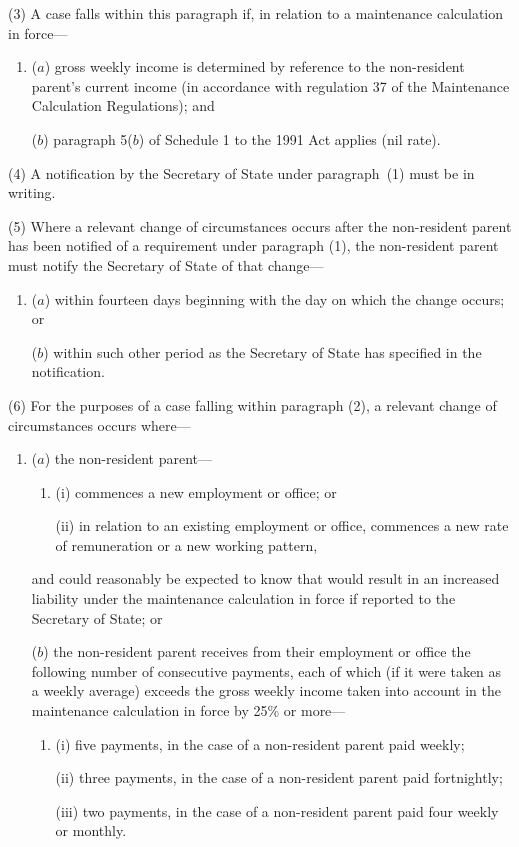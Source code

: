 \documentclass[12pt,a4paper]{article}
\begin{document}
(3) A case falls within this paragraph if, in relation to a maintenance calculation in force—
\begin{enumerate}\item[]
($a$) gross weekly income is determined by reference to the non-resident parent’s current income (in accordance with regulation 37 of the Maintenance Calculation Regulations); and

($b$) paragraph 5($b$)  of Schedule 1 to the 1991 Act applies (nil rate).
\end{enumerate}

(4) A notification by the Secretary of State under paragraph~(1) must be in writing.

(5) Where a relevant change of circumstances occurs after the non-resident parent has been notified of a requirement under paragraph (1), the non-resident parent must notify the Secretary of State of that change—
\begin{enumerate}\item[]
($a$) within fourteen days beginning with the day on which the change occurs; or

($b$) within such other period as the Secretary of State has specified in the notification.
\end{enumerate}

(6) For the purposes of a case falling within paragraph (2), a relevant change of circumstances occurs where—
\begin{enumerate}\item[]
($a$) the non-resident parent—
\begin{enumerate}\item[]
(i) commences a new employment or office; or

(ii) in relation to an existing employment or office, commences a new rate of remuneration or a new working pattern,
\end{enumerate}
and could reasonably be expected to know that would result in an increased liability under the maintenance calculation in force if reported to the Secretary of State; or

($b$) the non-resident parent receives from their employment or office the following number of consecutive payments, each of which (if it were taken as a weekly average) exceeds the gross weekly income taken into account in the maintenance calculation in force by 25\% or more—
\begin{enumerate}\item[]
(i) five payments, in the case of a non-resident parent paid weekly;

(ii) three payments, in the case of a non-resident parent paid fortnightly;

(iii) two payments, in the case of a non-resident parent paid four weekly or monthly.
\end{enumerate}
\end{enumerate}
\end{document}
